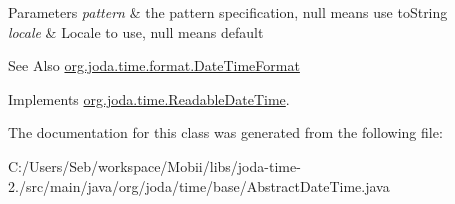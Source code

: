 \begin{DoxyParams}{Parameters}
{\em pattern} & the pattern specification, null means use {\ttfamily to\-String} \\
\hline
{\em locale} & Locale to use, null means default \\
\hline
\end{DoxyParams}
\begin{DoxySeeAlso}{See Also}
\hyperlink{classorg_1_1joda_1_1time_1_1format_1_1_date_time_format}{org.\-joda.\-time.\-format.\-Date\-Time\-Format} 
\end{DoxySeeAlso}


Implements \hyperlink{interfaceorg_1_1joda_1_1time_1_1_readable_date_time_acd376c7b0dea79685afac745249b0bce}{org.\-joda.\-time.\-Readable\-Date\-Time}.



The documentation for this class was generated from the following file\-:\begin{DoxyCompactItemize}
\item 
C\-:/\-Users/\-Seb/workspace/\-Mobii/libs/joda-\/time-\/2./src/main/java/org/joda/time/base/Abstract\-Date\-Time.\-java\end{DoxyCompactItemize}
